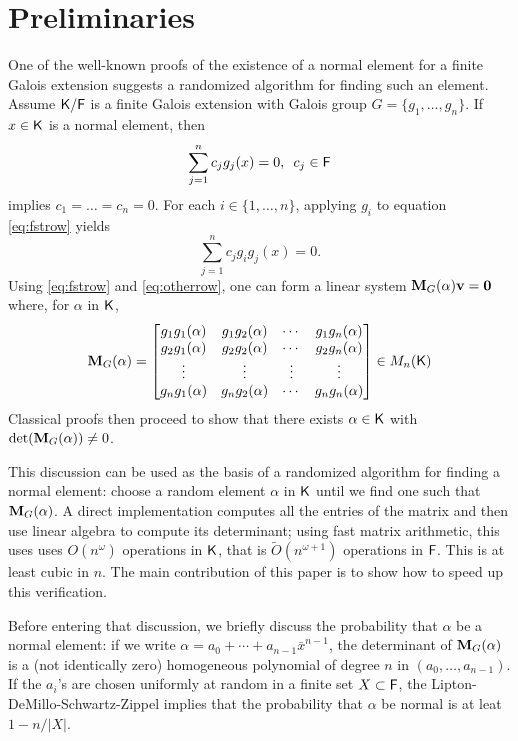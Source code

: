 \section{Preliminaries}
\label{sec:pre}

One of the well-known proofs of the existence of a normal element for a
finite Galois extension \cite[Theorem 6.13.1]{Lang} suggests a randomized
algorithm for finding such an element. Assume ${\mathsf{K}}/{\mathsf{F}}$ is a finite Galois
extension with Galois group $G = \lbrace g_1 , \ldots , g_n \rbrace$. If
$x \in {\mathsf{K}}$ is a normal element, then 
\begin{equation}
  \label{eq:fstrow}
  \sum_{j=1}^n 
  c_j g_j(x)=0, \,\,\, c_j \in {\mathsf{F}} 
\end{equation} 
implies $c_1 =\ldots=c_n = 0$. For each $i \in \lbrace 1, \ldots , n\rbrace$, applying $g_i$ to equation \eqref{eq:fstrow} yields
\begin{equation} \label{eq:otherrow}
 \sum_{j=1}^n 
 c_j g_i g_j(x)=0.
\end{equation}
Using \eqref{eq:fstrow} and \eqref{eq:otherrow}, one can form a linear
system $\mat{M}_G(\alpha)\textbf{v} = \textbf{0}$ where, for $\alpha$ in
${\mathsf{K}}$,
\[
  \mat M_G(\alpha) =
  \begin{bmatrix}
    g_1 g_1(\alpha) & g_1 g_2(\alpha) & \cdots & g_1 g_n(\alpha) \\
    g_2 g_1(\alpha) & g_2 g_2(\alpha) & \cdots & g_2 g_n(\alpha) \\
    \vdots		& \vdots	& \vdots & \vdots \\
    g_n g_1(\alpha) & g_n g_2(\alpha) & \cdots & g_n g_n(\alpha) \\
  \end{bmatrix} \in M_n(\K)
\]
Classical proofs then proceed to show that there exists $\alpha \in {\mathsf{K}}$
with $\det(\mat M_G(\alpha))\neq 0$.
 
This discussion can be used as the basis of a randomized algorithm for
finding a normal element: choose a random element $\alpha$ in ${\mathsf{K}}$
until we find one such that $ \mat M_G(\alpha)$. A direct
implementation computes all the entries of the matrix and then use
linear algebra to compute its determinant; using fast matrix
arithmetic, this uses uses $O(n^\omega)$ operations in ${\mathsf{K}}$, that is
$\tilde{O}(n^{\omega+1})$ operations in ${\mathsf{F}}$. This is at least cubic
in $n$. The main contribution of this paper is to show how to speed up
this verification.
 
Before entering that discussion, we briefly discuss the probability
that $\alpha$ be a normal element: if we write $\alpha = a_0 + \cdots
+ a_{n-1} \bar x^{n-1}$, the determinant of $\mat M_G(\alpha)$ is a
(not identically zero) homogeneous polynomial of degree $n$ in
$(a_0,\dots,a_{n-1})$. If the $a_i$'s are chosen uniformly at random
in a finite set $X \subset {\mathsf{F}}$, the Lipton-DeMillo-Schwartz-Zippel
implies that the probability that $\alpha$ be normal is at leat
$1-n/|X|$.

